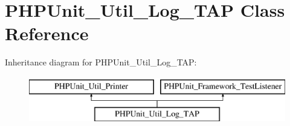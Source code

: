\hypertarget{class_p_h_p_unit___util___log___t_a_p}{}\section{P\+H\+P\+Unit\+\_\+\+Util\+\_\+\+Log\+\_\+\+T\+AP Class Reference}
\label{class_p_h_p_unit___util___log___t_a_p}
Inheritance diagram for P\+H\+P\+Unit\+\_\+\+Util\+\_\+\+Log\+\_\+\+T\+AP\+:\begin{figure}[H]
\begin{center}
\leavevmode
\includegraphics[height=2.000000cm]{class_p_h_p_unit___util___log___t_a_p}
\end{center}
\end{figure}
